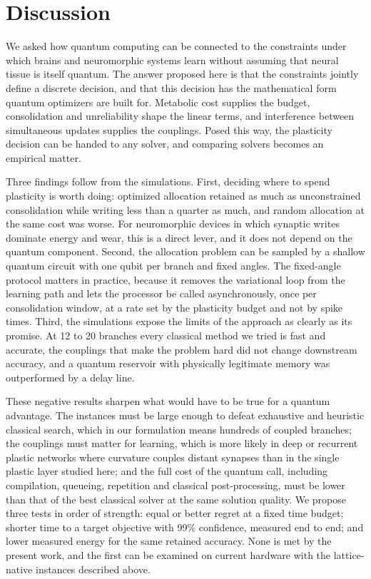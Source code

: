 \documentclass[12pt,a4paper]{article}
\begin{document}
\section*{Discussion}

We asked how quantum computing can be connected to the constraints under which brains and neuromorphic systems learn without assuming that neural tissue is itself quantum. The answer proposed here is that the constraints jointly define a discrete decision, and that this decision has the mathematical form quantum optimizers are built for. Metabolic cost supplies the budget, consolidation and unreliability shape the linear terms, and interference between simultaneous updates supplies the couplings. Posed this way, the plasticity decision can be handed to any solver, and comparing solvers becomes an empirical matter.

Three findings follow from the simulations. First, deciding where to spend plasticity is worth doing: optimized allocation retained as much as unconstrained consolidation while writing less than a quarter as much, and random allocation at the same cost was worse. For neuromorphic devices in which synaptic writes dominate energy and wear, this is a direct lever, and it does not depend on the quantum component. Second, the allocation problem can be sampled by a shallow quantum circuit with one qubit per branch and fixed angles. The fixed-angle protocol matters in practice, because it removes the variational loop from the learning path and lets the processor be called asynchronously, once per consolidation window, at a rate set by the plasticity budget and not by spike times. Third, the simulations expose the limits of the approach as clearly as its promise. At 12 to 20 branches every classical method we tried is fast and accurate, the couplings that make the problem hard did not change downstream accuracy, and a quantum reservoir with physically legitimate memory was outperformed by a delay line.

These negative results sharpen what would have to be true for a quantum advantage. The instances must be large enough to defeat exhaustive and heuristic classical search, which in our formulation means hundreds of coupled branches; the couplings must matter for learning, which is more likely in deep or recurrent plastic networks where curvature couples distant synapses than in the single plastic layer studied here; and the full cost of the quantum call, including compilation, queueing, repetition and classical post-processing, must be lower than that of the best classical solver at the same solution quality\cite{abbas2024,koch2026}. We propose three tests in order of strength: equal or better regret at a fixed time budget; shorter time to a target objective with 99\% confidence, measured end to end; and lower measured energy for the same retained accuracy. None is met by the present work, and the first can be examined on current hardware with the lattice-native instances described above.
\end{document}
